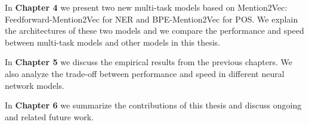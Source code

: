 In \textbf{Chapter 4} we present two new multi-task models based on Mention2Vec: Feedforward-Mention2Vec for NER and BPE-Mention2Vec for POS. We explain the architectures of these two models and we compare the performance and speed between multi-task models and other models in this thesis.

In \textbf{Chapter 5} we discuss the empirical results from the previous chapters. We also analyze the trade-off between performance and speed in different neural network models.

In \textbf{Chapter 6} we summarize the contributions of this thesis and discuss ongoing and related future work.